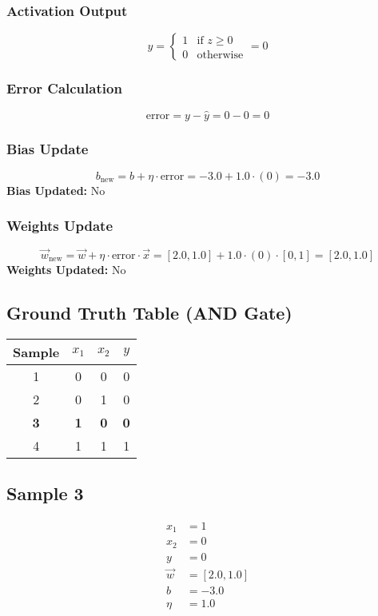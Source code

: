 \documentclass{article}
\begin{document}
\subsubsection*{Activation Output}
\[
\hat{y} =
\begin{cases}
1 & \text{if } z \geq 0 \\
0 & \text{otherwise}
\end{cases}
= 0
\]

\subsubsection*{Error Calculation}
\[
\text{error} = y - \hat{y} = 0 - 0 = 0
\]

\subsubsection*{Bias Update}
\[
b_{\text{new}} = b + \eta \cdot \text{error} = -3.0 + 1.0 \cdot (0) = -3.0
\]
\textbf{Bias Updated:} No

\subsubsection*{Weights Update}
\[
\vec{w}_{\text{new}} = \vec{w} + \eta \cdot \text{error} \cdot \vec{x} = 
[2.0, 1.0] + 1.0 \cdot (0) \cdot [0, 1] = 
[2.0, 1.0]
\]
\textbf{Weights Updated:} No

\subsection*{Ground Truth Table (AND Gate)}
\begin{center}
\begin{tabular}{|c|c|c|c|}
\hline
\textbf{Sample} & $x_1$ & $x_2$ & $y$ \\
\hline
1 & 0 & 0 & 0 \\
\hline
2 & 0 & 1 & 0 \\
\hline
\rowcolor{yellow} \textbf{3} & \textbf{1} & \textbf{0} & \textbf{0} \\
\hline
4 & 1 & 1 & 1 \\
\hline
\end{tabular}
\end{center}

\subsection*{Sample 3}
\begin{align*}
x_1 &= 1 \\
x_2 &= 0 \\
y &= 0 \\
\vec{w} &= [2.0, 1.0] \\
b &= -3.0 \\
\eta &= 1.0
\end{align*}
\end{document}
